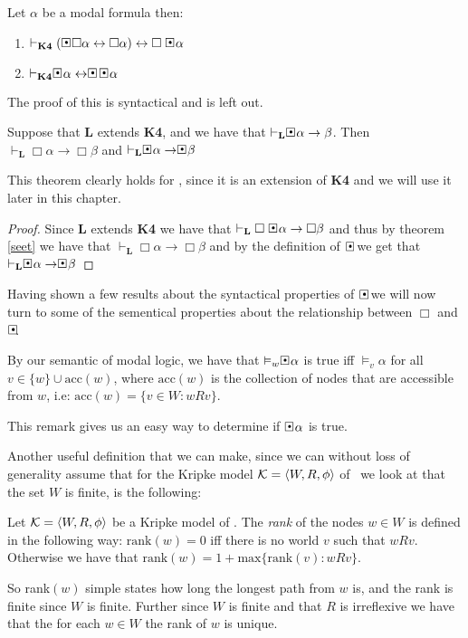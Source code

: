\documentclass[../main.tex]{subfiles}
\begin{document}
\begin{thm}
	\label{seet}
	Let $\alpha$ be a modal formula then:
	\begin{enumerate}
		\item $\vdash_{\textbf{K4}}(\sBox\Box\alpha\leftrightarrow\Box\alpha)\leftrightarrow
	\Box\sBox \alpha$
	\item $\vdash_{\textbf{K4}}\sBox\alpha\leftrightarrow\sBox\
		\sBox\alpha$
	\end{enumerate}
\end{thm}
The proof of this is syntactical and is left out.
\begin{thm}
	\label{GLsæt}
	Suppose that \textbf{L} extends \textbf{K4}, and we have that
	$\vdash_{\textbf{L}}\sBox\alpha\rightarrow\beta$. Then
	$\vdash_{\textbf{L}}\Box\alpha\rightarrow\Box\beta$ and
	$\vdash_{\textbf{L}}\sBox\alpha\rightarrow\sBox\beta$
\end{thm}
This theorem clearly holds for \GL, since it is an extension of \textbf{K4} and we will use it later in this chapter.
\begin{proof}
	Since \textbf{L} extends \textbf{K4} we have that
	$\vdash_{\textbf{L}}\Box\sBox\alpha\rightarrow\Box\beta$ and thus by
	theorem \ref{seet} we have that
	$\vdash_{\textbf{L}}\Box\alpha\rightarrow\Box\beta$ and by the
	definition of $\sBox$ we get that
	$\vdash_{\textbf{L}}\sBox\alpha\rightarrow\sBox\beta$
\end{proof}
Having shown a few results about the syntactical  properties of $\sBox$ we will now
turn to some of the sementical properties about the relationship between $\Box$
and $\sBox$.
\begin{remark}
	\label{rem:acc}
By our semantic of modal logic,  we have that $\vDash_w\sBox\alpha$ is true iff $\vDash_v\alpha$
for all $v\in\{w\}\cup\text{acc}(w)$, where $\text{acc}(w)$
is the collection of nodes that are accessible  from $w$, i.e:
$\text{acc}(w)=\{v\in W:wRv\}$.
\end{remark}

This remark gives us an easy way to determine if $\sBox \alpha$ is true.


Another useful definition that we can make, since we can without loss of
generality assume that for the  Kripke model 
$\mathcal{K}=\langle W,R,\phi\rangle$ of \GL\  we look at that the set $W$ is finite,
is the following:
\begin{defi}
	Let $\mathcal{K}=\langle W,R,\phi\rangle$ be a Kripke model of \GL. The
	\textit{rank} of the nodes $w\in W$ is defined in the following
	way: $\text{rank}(w)=0$ iff there is no world $v$ such that
	$wRv$. Otherwise we have that
	$\text{rank}(w)=1+\text{max}\{\text{rank}(v):wRv\}$.
\end{defi}
So rank$(w)$ simple states how long the longest path from $w$ is, and the
rank is finite since $W$ is finite.
Further since $W$ is finite and that $R$ is irreflexive we have that the for each $w\in
W$ the rank of $w$ is unique.
\end{document}

